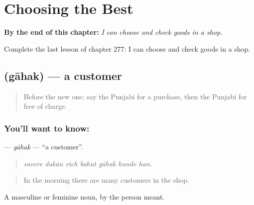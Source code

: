 
\chapter{Choosing the Best}
\label{ch:pa-a2-choosing-the-best}

\begin{chapteropening}
\textbf{By the end of this chapter:} \emph{I can choose and check goods in a shop.}

Complete the last lesson of chapter 277: I can choose and check goods in a shop.
\end{chapteropening}

\section[\texorpdfstring{\pa{ਗਾਹਕ} (gāhak)}{ਗਾਹਕ (gāhak)}]{ (gāhak) — a customer}

\label{lesson:PA-C277-gahak}



\begin{quote}
Before the new one: say the Punjabi for a purchase, then the Punjabi for free of charge.
\end{quote}

\subsection*{You'll want to know: }
\textbf{} — \emph{gāhak} — \textquotedblleft{}a customer\textquotedblright{}.

\begin{quote}
      
\end{quote}

\begin{quote}
\emph{savere dukān vich bahut gāhak hunde han.}
\end{quote}

\begin{quote}
In the morning there are many customers in the shop.
\end{quote}

A masculine or feminine noun, by the person meant.

